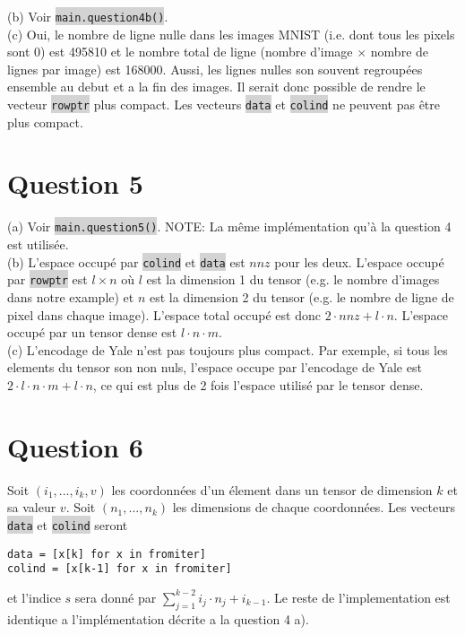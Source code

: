 \documentclass[10pt]{article}
\newcommand{\code}[1]{{\small\colorbox{LightGray}{\texttt{#1}}}}
\begin{document}
(b) Voir \code{main.question4b()}.\\

(c) Oui, le nombre de ligne nulle dans les images MNIST (i.e. dont tous les pixels sont 0) est 495810 et le nombre total de ligne (nombre d'image $\times$ nombre de lignes par image) est 168000. Aussi, les lignes nulles son souvent regroupées ensemble au debut et a la fin des images. Il serait donc possible de rendre le vecteur \code{rowptr} plus compact. Les vecteurs \code{data} et \code{colind} ne peuvent pas être plus compact.

\section*{Question 5}
(a) Voir \code{main.question5()}. NOTE: La même implémentation qu'à la question 4 est utilisée.\\

(b) L'espace occupé par \code{colind} et \code{data} est $nnz$ pour les deux. L'espace occupé par \code{rowptr} est $l \times n$ où $l$ est la dimension 1 du tensor (e.g. le nombre d'images dans notre example) et $n$ est la dimension 2 du tensor (e.g. le nombre de ligne de pixel dans chaque image). L'espace total occupé est donc $2\cdot nnz + l\cdot n$. L'espace occupé par un tensor dense est $l\cdot n \cdot m$. \\

(c) L'encodage de Yale n'est pas toujours plus compact. Par exemple, si tous les elements du tensor son non nuls, l'espace occupe par l'encodage de Yale est $2\cdot l\cdot n \cdot m + l\cdot n$, ce qui est plus de 2 fois l'espace utilisé par le tensor dense.

\section*{Question 6}
Soit $(i_1,...,i_k, v)$ les coordonnées d'un élement dans un tensor de dimension $k$ et sa valeur $v$. Soit $(n_1,...,n_k)$ les dimensions de chaque coordonnées. Les vecteurs \code{data} et \code{colind} seront
\begin{verbatim}
data = [x[k] for x in fromiter] 
colind = [x[k-1] for x in fromiter]
\end{verbatim}
et l'indice $s$ sera donné par $\sum_{j=1}^{k-2} i_j \cdot n_j + i_{k-1}$. Le reste de l'implementation est identique a l'implémentation décrite a la question 4 a).
\end{document}

